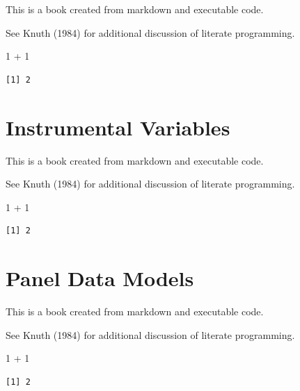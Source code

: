 \documentclass[
  letterpaper,
  DIV=11,
  numbers=noendperiod]{scrreprt}
\newenvironment{Shaded}{\begin{snugshade}}{\end{snugshade}}
\newcommand{\DecValTok}[1]{\textcolor[rgb]{0.68,0.00,0.00}{#1}}
\newcommand{\SpecialCharTok}[1]{\textcolor[rgb]{0.37,0.37,0.37}{#1}}
\theoremstyle{definition}
\theoremstyle{remark}
\begin{document}
This is a book created from markdown and executable code.

See Knuth (1984) for additional discussion of literate programming.

\begin{Shaded}
\begin{Highlighting}[]
\DecValTok{1} \SpecialCharTok{+} \DecValTok{1}
\end{Highlighting}
\end{Shaded}

\begin{verbatim}
[1] 2
\end{verbatim}

\hypertarget{instrumental-variables}{%
\chapter{Instrumental Variables}\label{instrumental-variables}}

This is a book created from markdown and executable code.

See Knuth (1984) for additional discussion of literate programming.

\begin{Shaded}
\begin{Highlighting}[]
\DecValTok{1} \SpecialCharTok{+} \DecValTok{1}
\end{Highlighting}
\end{Shaded}

\begin{verbatim}
[1] 2
\end{verbatim}

\hypertarget{panel-data-models}{%
\chapter{Panel Data Models}\label{panel-data-models}}

This is a book created from markdown and executable code.

See Knuth (1984) for additional discussion of literate programming.

\begin{Shaded}
\begin{Highlighting}[]
\DecValTok{1} \SpecialCharTok{+} \DecValTok{1}
\end{Highlighting}
\end{Shaded}

\begin{verbatim}
[1] 2
\end{verbatim}
\end{document}
